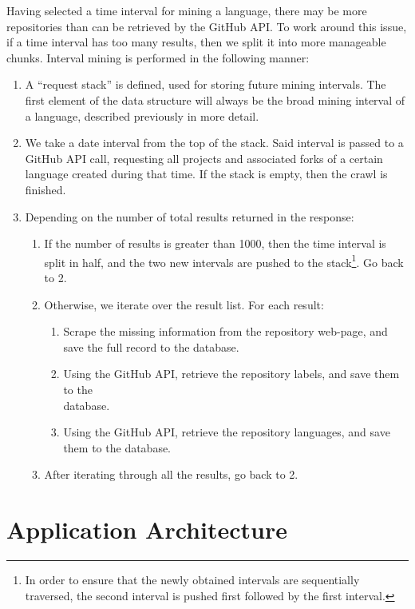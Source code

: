 Having selected a time interval for mining a language, there may be more repositories than can be retrieved by the GitHub API\@.
To work around this issue, if a time interval has too many results, then we split it into more manageable chunks.
Interval mining is performed in the following manner:
\begin{enumerate}
    \item A ``request stack'' is defined, used for storing future mining intervals. The first element of the data structure will always be the broad mining interval of a language, described previously in more detail.
    \item We take a date interval from the top of the stack. Said interval is passed to a GitHub API call, requesting all projects and associated forks of a certain language created during that time. If the stack is empty, then the crawl is finished.
    \item Depending on the number of total results returned in the response:
    \begin{enumerate}
        \item If the number of results is greater than 1000, then the time interval is split in half, and the two new intervals are pushed to the stack\footnote{In order to ensure that the newly obtained intervals are sequentially traversed, the second interval is pushed first followed by the first interval.}. Go back to 2.
        \item Otherwise, we iterate over the result list. For each result:
        \begin{enumerate}
            \item Scrape the missing information from the repository web-page, and save the full record to the database.
            \item Using the GitHub API, retrieve the repository labels, and save them to the
            \\database.
            \item Using the GitHub API, retrieve the repository languages, and save them to the database.
        \end{enumerate}
        \item After iterating through all the results, go back to 2.
    \end{enumerate}
\end{enumerate}

\newpage
\section{Application Architecture}